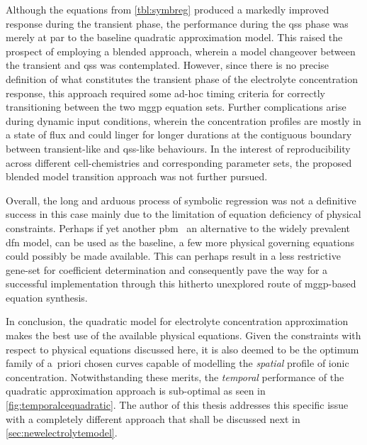 Although  the equations  from \cref{tbl:symbreg}  produced  a markedly  improved
response during the transient phase,  the performance during the \gls{qss} phase
was merely at par to the baseline quadratic approximation model. This raised the
prospect of  employing a  blended approach, wherein  a model  changeover between
the  transient  and \gls{qss}  was  contemplated.  However,  since there  is  no
precise definition  of what constitutes  the transient phase of  the electrolyte
concentration response, this  approach required some ad-hoc  timing criteria for
correctly  transitioning  between  the  two \gls{mggp}  equation  sets.  Further
complications arise  during dynamic input conditions,  wherein the concentration
profiles are mostly in a state of  flux and could linger for longer durations at
the contiguous  boundary between  transient-like and  \gls{qss}-like behaviours.
In  the  interest  of  reproducibility  across  different  cell-chemistries  and
corresponding parameter sets, the proposed blended model transition approach was
not further pursued.

Overall,  the  long  and  arduous  process of  symbolic  regression  was  not  a
definitive  success in  this  case  mainly due  to  the  limitation of  equation
deficiency  of physical  constraints. Perhaps  if yet  another \gls{pbm}  \ie~an
alternative  to  the widely  prevalent  \gls{dfn}  model,  can  be used  as  the
baseline,  a  few more  physical  governing  equations  could possibly  be  made
available.  This  can  perhaps  result   in  a  less  restrictive  gene-set  for
coefficient  determination  and  consequently  pave the  way  for  a  successful
implementation  through  this  hitherto  unexplored  route  of  \gls{mggp}-based
equation synthesis.

In conclusion,  the quadratic model for  electrolyte concentration approximation
makes the  best use of the  available physical equations. Given  the constraints
with  respect to  physical equations  discussed here,  it is  also deemed  to be
the  optimum  family  of  a~priori  chosen  curves  capable  of  modelling  the
\emph{spatial}  profile of  ionic concentration.  Notwithstanding these  merits,
the  \emph{temporal}  performance of  the  quadratic  approximation approach  is
sub-optimal as seen in \cref{fig:temporalcequadratic}. The author of this thesis
addresses this specific issue with a completely different approach that shall be
discussed next in \cref{sec:newelectrolytemodel}.

